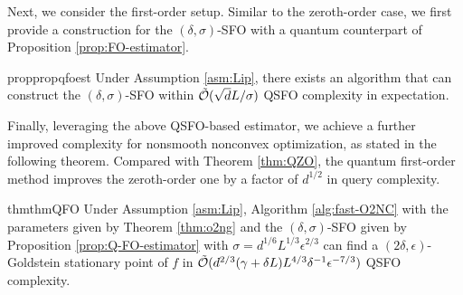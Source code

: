 
	Next, we consider the first-order setup. Similar to the zeroth-order case, we first provide a construction for the $(\delta, \sigma)$-SFO with a quantum counterpart of Proposition \ref{prop:FO-estimator}.

	\begin{restatable}{prop}{propqfoest}
		\label{prop:Q-FO-estimator}
		Under Assumption \ref{asm:Lip},
		there exists an algorithm that can construct the $(\delta,\sigma)$-SFO within $\tilde {{\mathcal{O}}}( \sqrt{d} L / \sigma )$ QSFO complexity in expectation.
	\end{restatable}

	Finally, leveraging the above QSFO-based estimator, we achieve a further improved complexity for nonsmooth nonconvex optimization, as stated in the following theorem. Compared with Theorem \ref{thm:QZO}, the quantum first-order method improves the zeroth-order one by a factor of $d^{1/2}$ in query complexity.

	\begin{restatable}{thm}{thmQFO}
		\label{thm:QFO}
		Under Assumption \ref{asm:Lip}, Algorithm \ref{alg:fast-O2NC} with the parameters given by Theorem \ref{thm:o2ng} and the $(\delta,\sigma)$-SFO given by Proposition \ref{prop:Q-FO-estimator} with $\sigma= d^{1/6} L^{1/3} \epsilon^{2/3}$ can find a $(2\delta,\epsilon)$-Goldstein stationary point of $f$ in $\tilde {{\mathcal{O}}}(d^{2/3}(\gamma + \delta L) L^{4/3} \delta^{-1} \epsilon^{-7/3})$ QSFO complexity.
	\end{restatable}

